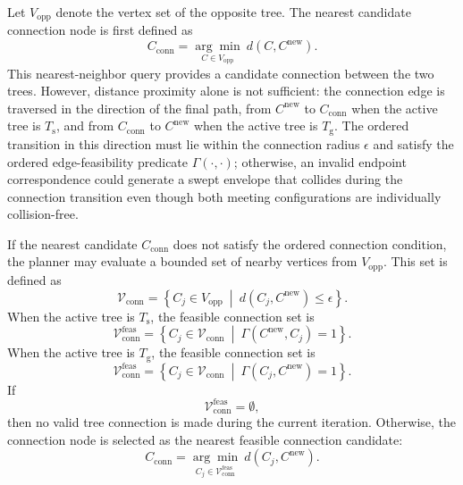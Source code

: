 \documentclass{pas}
\begin{document}
Let \(V_{\mathrm{opp}}\) denote the vertex set of the opposite tree. The nearest
candidate connection node is first defined as
\begin{equation}
C_{\mathrm{conn}}
=
\underset{C\in V_{\mathrm{opp}}}{\arg\min} \
d(C,C^{\mathrm{new}}).
\label{eq:gcr_connection_candidate}
\end{equation}
This nearest-neighbor query provides a candidate connection between the two
trees. However, distance proximity alone is not sufficient: the connection edge
is traversed in the direction of the final path, from \(C^{\mathrm{new}}\) to
\(C_{\mathrm{conn}}\) when the active tree is \(T_{\mathrm{s}}\), and from
\(C_{\mathrm{conn}}\) to \(C^{\mathrm{new}}\) when the active tree is
\(T_{\mathrm{g}}\). The ordered transition in this direction must lie within
the connection radius \(\epsilon\) and satisfy the ordered edge-feasibility
predicate \(\Gamma(\cdot,\cdot)\); otherwise, an invalid endpoint
correspondence could generate a swept envelope that collides during the
connection transition even though both meeting configurations are individually
collision-free.

If the nearest candidate \(C_{\mathrm{conn}}\) does not satisfy the ordered
connection condition, the planner may evaluate a bounded set of nearby vertices
from \(V_{\mathrm{opp}}\). This set is defined as
\begin{equation}
\mathcal{V}_{\mathrm{conn}}
=
\left\{
C_j\in V_{\mathrm{opp}}
\ \middle|\
d(C_j,C^{\mathrm{new}})\leq\epsilon
\right\}.
\label{eq:gcr_connection_candidate_set}
\end{equation}
When the active tree is \(T_{\mathrm{s}}\), the feasible connection set is
\begin{equation}
\mathcal{V}_{\mathrm{conn}}^{\mathrm{feas}}
=
\left\{
C_j\in \mathcal{V}_{\mathrm{conn}}
\ \middle|\
\Gamma(C^{\mathrm{new}},C_j)=1
\right\}.
\label{eq:gcr_feasible_connection_set_start_active}
\end{equation}
When the active tree is \(T_{\mathrm{g}}\), the feasible connection set is
\begin{equation}
\mathcal{V}_{\mathrm{conn}}^{\mathrm{feas}}
=
\left\{
C_j\in \mathcal{V}_{\mathrm{conn}}
\ \middle|\
\Gamma(C_j,C^{\mathrm{new}})=1
\right\}.
\label{eq:gcr_feasible_connection_set_goal_active}
\end{equation}
If
\begin{equation}
\mathcal{V}_{\mathrm{conn}}^{\mathrm{feas}}=\emptyset,
\end{equation}
then no valid tree connection is made during the current iteration. Otherwise,
the connection node is selected as the nearest feasible connection candidate:
\begin{equation}
C_{\mathrm{conn}}
=
\underset{C_j\in \mathcal{V}_{\mathrm{conn}}^{\mathrm{feas}}}{\arg\min} \
d(C_j,C^{\mathrm{new}}).
\label{eq:gcr_selected_feasible_connection}
\end{equation}
\end{document}
